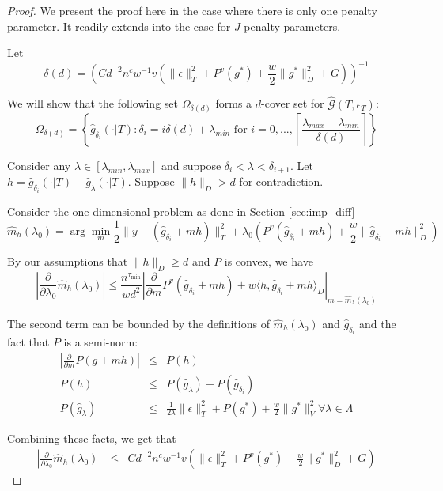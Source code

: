 \documentclass[12pt]{article}
\begin{document}
\begin{proof}
We present the proof here in the case where there is only one penalty parameter. It readily extends into the case for $J$ penalty parameters.

Let 
\[
\delta(d)=\left ( Cd^{-2}n^{c}w^{-1}v\left(\|\epsilon\|_{T}^{2}+P^{v}(g^{*})+\frac{w}{2}\|g^{*}\|_{D}^{2}+G\right) \right )^{-1}
\]

We will show that the following set $\Omega_{\delta(d)}$ forms a
$d$-cover set for $\hat{\mathcal{G}}(T,\epsilon_{T})$: 
\[
\Omega_{\delta(d)}=\left\{ \hat{g}_{\delta_{i}}(\cdot|T):\delta_{i}=i\delta(d)+\lambda_{min}\mbox{ for }i=0,...,\left\lceil \frac{\lambda_{max}-\lambda_{min}}{\delta(d)}\right\rceil \right\} 
\]


Consider any $\lambda\in[\lambda_{min},\lambda_{max}]$ and suppose
$\delta_{i}<\lambda<\delta_{i+1}$. Let $h=\hat{g}_{\delta_{i}}(\cdot|T)-\hat{g}_{\lambda}(\cdot|T)$.
Suppose $\|h\|_{D}>d$ for contradiction.

Consider the one-dimensional problem as done in Section \ref{sec:imp_diff}
\[
\hat{m}_{h}(\lambda_{0})=\arg\min_{m}\frac{1}{2}\|y-(\hat{g}_{\delta_{i}}+mh)\|_{T}^{2}+\lambda_{0}\left(P^{v}(\hat{g}_{\delta_{i}}+mh)+\frac{w}{2}\|\hat{g}_{\delta_{i}}+mh\|_{D}^{2}\right)
\]

By our assumptions that $\|h\|_{D} \ge d$ and $P$ is convex, we have
\begin{equation}
\left | \frac{\partial}{\partial\lambda_{0}}\hat{m}_{h}(\lambda_{0}) \right | \le 
\frac{n^{\tau_{\min}}}{wd^{2}}
\left | \frac{\partial}{\partial m}P^{v}(\hat{g}_{\delta_{i}}+mh)+w\langle h,\hat{g}_{\delta_{i}}+mh\rangle_{D}
\right |_{m=\hat{m}_{\lambda}(\lambda_{0})}
\end{equation}

The second term can be bounded by the definitions of $\hat{m}_{h}(\lambda_{0})$ and $\hat{g}_{\delta_i}$ and the fact that $P$ is a semi-norm:
\begin{eqnarray*}
\left | \frac{\partial}{\partial m} P(g+mh) \right | & \le & P(h)\\
P(h) &\le & P(\hat{g}_{\lambda}) + P(\hat{g}_{\delta_i})\\
P(\hat{g}_{\lambda}) & \le & \frac{1}{2 \lambda} \| \epsilon \|_T^2 + P(g^*) + \frac{w}{2} \| g^* \|_V^2 \forall \lambda \in \Lambda
\end{eqnarray*}

Combining these facts, we get that
\begin{eqnarray*}
\left|\frac{\partial}{\partial\lambda_{0}}\hat{m}_{h}(\lambda_{0})\right| & \le & Cd^{-2}n^{c}w^{-1}v\left(\|\epsilon\|_{T}^{2}+P^{v}(g^{*})+\frac{w}{2}\|g^{*}\|_{D}^{2}+G\right)
\end{eqnarray*}


\end{proof}
\end{document}
